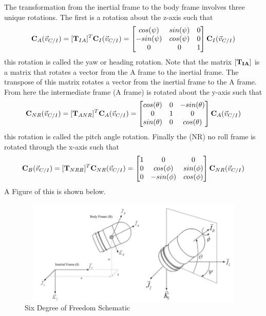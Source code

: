 \documentclass{article}
\begin{document}
The transformation from the inertial frame to the body frame involves
three unique rotations. The first is a rotation about the z-axis such
that
\begin{equation}
{\bf C}_A(\vec{v}_{C/I}) = [{\bf T}_{IA}]^T{\bf C}_I(\vec{v}_{C/I})= \begin{bmatrix} cos(\psi) & sin(\psi) & 0
  \\ -sin(\psi) & cos(\psi) & 0 \\ 0 & 0 & 1 \end{bmatrix} {\bf C}_I(\vec{v}_{C/I})
\end{equation}
this rotation is called the yaw or heading rotation. Note that the matrix $[{\bf T_{IA}}]$ is a matrix that rotates a vector from the A frame to the inertial frame. The transpose of this matrix rotates a vector from the inertial frame to the A frame. From here the
intermediate frame (A frame) is rotated about the y-axis such that
\begin{equation}
{\bf C}_{NR}(\vec{v}_{C/I}) = [{\bf T}_{ANR}]^T{\bf C}_A(\vec{v}_{C/I})=\begin{bmatrix} cos(\theta) & 0 &
  -sin(\theta) \\ 0 & 1 & 0 \\ sin(\theta) & 0 & cos(\theta) \end{bmatrix} {\bf C}_A(\vec{v}_{C/I})
\end{equation}
this rotation is called the pitch angle rotation. Finally the (NR) no roll
frame is rotated through the x-axis such that
\begin{equation}
{\bf C}_{B}(\vec{v}_{C/I}) = [{\bf T}_{NRB}]^T{\bf C}_{NR}(\vec{v}_{C/I})=\begin{bmatrix} 1 & 0 & 0 \\ 0 & cos(\phi) & sin(\phi)
  \\ 0 & -sin(\phi) & cos(\phi) \end{bmatrix} {\bf C}_{NR}(\vec{v}_{C/I})
\end{equation}
A Figure of this is shown below.
\begin{figure}[H]
  \begin{center}
  \includegraphics[height=50mm, width=120mm]{Figures/6DOFrocketschematic.png}
  \end{center}
  \caption{Six Degree of Freedom Schematic}
\end{figure}
\end{document}
